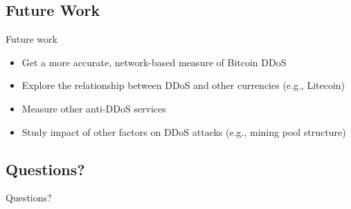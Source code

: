 \documentclass{beamer}
\begin{document}
\subsection{Future Work}
\begin{frame}{Future work}

	\begin{itemize}
                  \item Get a more accurate, network-based measure of
                    Bitcoin DDoS
		\item Explore the relationship between DDoS and other currencies (e.g., Litecoin)
		\item Measure other anti-DDoS services
                  \item Study impact of other factors on DDoS attacks (e.g., mining pool structure)
	\end{itemize}
\end{frame}
\subsection{Questions?}
\begin{frame}
	\center
	\begin{center}
		\huge{Questions?}
	\end{center}
\end{frame}
\end{document}
